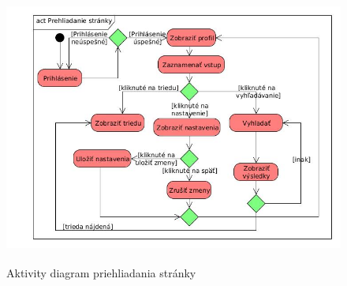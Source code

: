 \documentclass[slovak, 12pt, Times New Roman]{article}
\begin{document}
			\begin{figure}[!htb]
				\centering
				\includegraphics[width = 16cm, height = 9cm]{AddPostActivity.jpg}
				\caption{Aktivity diagram priehliadania stránky	}
				\label{fig:Reinforcement}
			\end{figure}
		\clearpage
\end{document}
